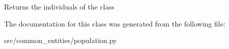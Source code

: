 \label{classsrc_1_1common__entities_1_1population_1_1Population_afb228d8168d2d77027c40d06284f2c82}
\begin{DoxyVerb}
Returns the individuals of the class
\end{DoxyVerb}
 

The documentation for this class was generated from the following file:\begin{DoxyCompactItemize}
\item 
src/common\_\-entities/population.py\end{DoxyCompactItemize}
